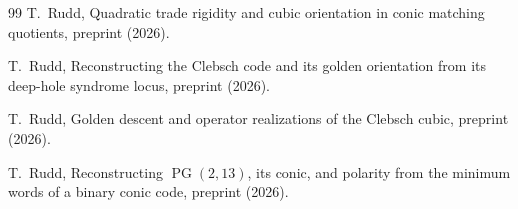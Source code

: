 \documentclass[11pt]{article}
\theoremstyle{definition}
\theoremstyle{remark}
\begin{document}
\begin{thebibliography}{99}
T.~Rudd,
\newblock Quadratic trade rigidity and cubic orientation in conic matching
quotients,
\newblock preprint (2026).

T.~Rudd,
\newblock Reconstructing the Clebsch code and its golden orientation from its
deep-hole syndrome locus,
\newblock preprint (2026).

T.~Rudd,
\newblock Golden descent and operator realizations of the Clebsch cubic,
\newblock preprint (2026).

T.~Rudd,
\newblock Reconstructing \(\operatorname{PG}(2,13)\), its conic, and polarity
from the minimum words of a binary conic code,
\newblock preprint (2026).

\end{thebibliography}
\end{document}
